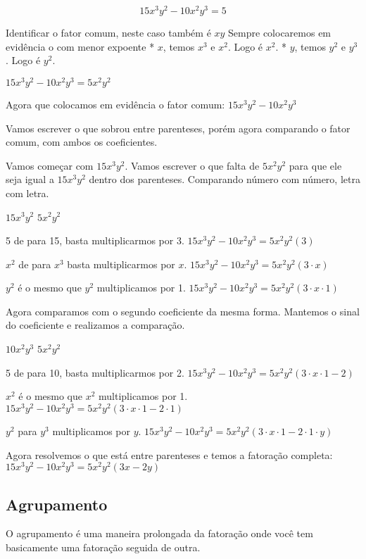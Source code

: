 \documentclass[letterpaper]{book}
\begin{document}
\[15x^{3}y^{2} - 10x^{2}y^{3} = 5\]

Identificar o fator comum, neste caso também é \(xy\)
Sempre colocaremos em evidência o com menor expoente 
 * \(x\), temos $x^{3}$ e $x^{2}$. Logo é $x^{2}$.
 * \(y\), temos $y^{2}$ e $y^{3}$. Logo é $y^{2}$.

\(15x^{3}y^{2} - 10x^{2}y^{3} = 5x^{2}y^{2}\)

Agora que colocamos em evidência o fator comum: \(15x^{3}y^{2} - 10x^{2}y^{3}\) 

Vamos escrever o que sobrou entre parenteses, porém agora comparando o fator comum, com ambos os coeficientes.

Vamos começar com \(15x^{3}y^{2}\). Vamos escrever o que falta de $5x^{2}y^{2}$ para que ele seja igual a $15x^{3}y^{2}$ dentro dos parenteses. Comparando número com número, letra com letra.
 
\(15x^{3}y^{2}\)
\(5x^{2}y^{2}\)

5 de para 15, basta multiplicarmos por 3.
\(15x^{3}y^{2} - 10x^{2}y^{3} = 5x^{2}y^{2}(3)\)

\(x^{2}\) de para $x^{3}$ basta multiplicarmos por $x$.
\(15x^{3}y^{2} - 10x^{2}y^{3} = 5x^{2}y^{2}(3 \cdot x)\)

\(y^{2}\) é o mesmo que $y^{2}$ multiplicamos por 1.
\(15x^{3}y^{2} - 10x^{2}y^{3} = 5x^{2}y^{2}(3 \cdot x \cdot 1)\)

Agora comparamos com o segundo coeficiente da mesma forma. Mantemos o sinal do coeficiente e realizamos a comparação.

\(10x^{2}y^{3}\)
\(5x^{2}y^{2}\)

5 de para 10, basta multiplicarmos por 2.
\(15x^{3}y^{2} - 10x^{2}y^{3} = 5x^{2}y^{2}(3 \cdot x \cdot 1 - 2)\)

\(x^{2}\) é o mesmo que $x^{2}$ multiplicamos por 1.
\(15x^{3}y^{2} - 10x^{2}y^{3} = 5x^{2}y^{2}(3 \cdot x \cdot 1 - 2 \cdot 1)\)

\(y^{2}\) para $y^{3}$ multiplicamos por $y$.
\(15x^{3}y^{2} - 10x^{2}y^{3} = 5x^{2}y^{2}(3 \cdot x \cdot 1 - 2 \cdot 1 \cdot y)\)

Agora resolvemos o que está entre parenteses e temos a fatoração completa:
\(15x^{3}y^{2} - 10x^{2}y^{3} = 5x^{2}y^{2}(3x - 2y)\)

\subsection{Agrupamento}

O agrupamento é uma maneira prolongada da fatoração onde você tem basicamente uma fatoração seguida de outra.
\end{document}
